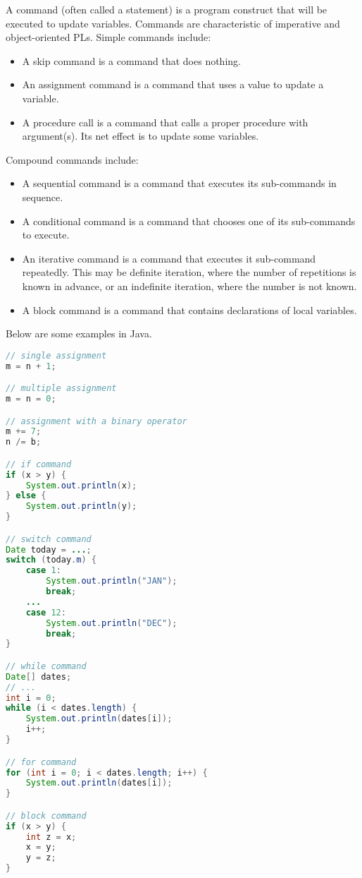 \documentclass[a4paper, openany]{memoir}
\begin{document}
A command (often called a statement) is a program construct that will be executed to update variables. Commands are characteristic of imperative and object-oriented PLs. Simple commands include:
\begin{itemize}
    \item A skip command is a command that does nothing.
    \item An assignment command is a command that uses a value to update a variable.
    \item A procedure call is a command that calls a proper procedure with argument(s). Its net effect is to update some variables.
\end{itemize}
Compound commands include:
\begin{itemize}
    \item A sequential command is a command that executes its sub-commands in sequence.
    \item A conditional command is a command that chooses one of its sub-commands to execute.
    \item An iterative command is a command that executes it sub-command repeatedly. This may be definite iteration, where the number of repetitions is known in advance, or an indefinite iteration, where the number is not known.
    \item A block command is a command that contains declarations of local variables.
\end{itemize}
Below are some examples in Java.
\begin{lstlisting}[language=Java]
// single assignment
m = n + 1;

// multiple assignment
m = n = 0;

// assignment with a binary operator
m += 7;
n /= b;

// if command
if (x > y) {
    System.out.println(x);
} else {
    System.out.println(y);
}

// switch command
Date today = ...;
switch (today.m) {
    case 1:
        System.out.println("JAN");
        break;
    ...
    case 12:
        System.out.println("DEC");
        break;
}

// while command
Date[] dates;
// ...
int i = 0;
while (i < dates.length) {
    System.out.println(dates[i]);
    i++;
}

// for command
for (int i = 0; i < dates.length; i++) {
    System.out.println(dates[i]);
}

// block command
if (x > y) {
    int z = x;
    x = y;
    y = z;
}
\end{lstlisting}
\end{document}
